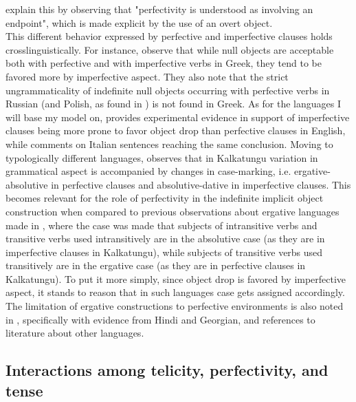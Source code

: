 \textcite[1609]{TsimpliPapadopoulou2006} explain this by observing that "perfectivity is understood as involving an endpoint", which is made explicit by the use of an overt object.\\
This different behavior expressed by perfective and imperfective clauses holds crosslinguistically. For instance, \textcite[1597]{TsimpliPapadopoulou2006} observe that while null objects are acceptable both with perfective and with imperfective verbs in Greek, they tend to be favored more by imperfective aspect. They also note \parencite[1601]{TsimpliPapadopoulou2006} that the strict ungrammaticality of indefinite null objects occurring with perfective verbs in Russian (and Polish, as found in \textcite[89]{sopata2016null}) is not found in Greek. As for the languages I will base my model on, \textcite{Medina2007} provides experimental evidence in support of imperfective clauses being more prone to favor object drop than perfective clauses in English, while \textcite{Cennamo2017} comments on Italian sentences reaching the same conclusion. Moving to typologically different languages, \textcite[118]{Naess2007} observes that in Kalkatungu variation in grammatical aspect is accompanied by changes in case-marking, i.e. ergative-absolutive in perfective clauses and absolutive-dative in imperfective clauses. This becomes relevant for the role of perfectivity in the indefinite implicit object construction when compared to previous observations about ergative languages made in , where the case was made that subjects of intransitive verbs and transitive verbs used intransitively are in the absolutive case (as they are in imperfective clauses in Kalkatungu), while subjects of transitive verbs used transitively are in the ergative case (as they are in perfective clauses in Kalkatungu). To put it more simply, since object drop is favored by imperfective aspect, it stands to reason that in such languages case gets assigned accordingly. The limitation of ergative constructions to perfective environments is also noted in \textcite[271]{HopperThompson1980}, specifically with evidence from Hindi and Georgian, and references to literature about other languages.

\subsection{Interactions among telicity, perfectivity, and tense} 

